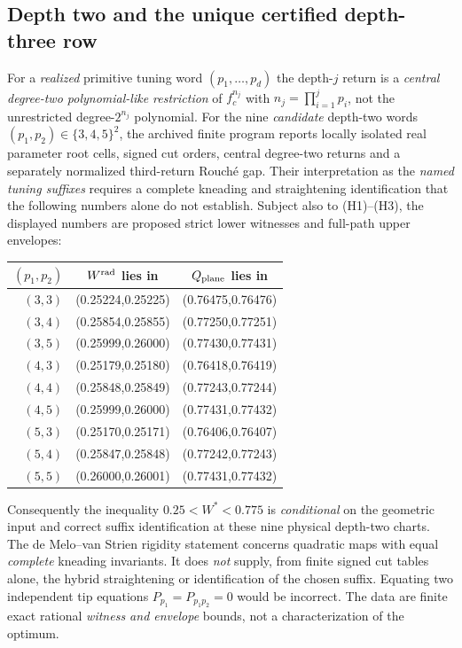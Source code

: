 \subsection{Depth two and the unique certified depth-three row}
For a \emph{realized} primitive
tuning word
$(p_1,\ldots,p_d)$
the depth-$j$ return is a
\emph{central degree-two
polynomial-like restriction}
of $f_c^{n_j}$ with
$n_j=\prod_{i=1}^j p_i$,
not the unrestricted
degree-$2^{n_j}$ polynomial.
For the nine \emph{candidate} depth-two
words $(p_1,p_2)\in\{3,4,5\}^2$,
the archived finite program reports
locally isolated real parameter
root cells, signed cut orders,
central degree-two returns and
a separately normalized third-return
Rouch\'e gap.  Their interpretation
as the \emph{named tuning suffixes}
requires a complete kneading and
straightening identification that
the following numbers alone do not
establish.  Subject also to (H1)--(H3),
the displayed numbers are proposed
strict lower witnesses and full-path
upper envelopes:
\begin{center}
\begin{tabular}{rcc}
\toprule
$(p_1,p_2)$ & $W^{\rm rad}$ lies in&
$Q_{\rm plane}$ lies in\\\midrule
$(3,3)$&(0.25224,0.25225)&(0.76475,0.76476)\\
$(3,4)$&(0.25854,0.25855)&(0.77250,0.77251)\\
$(3,5)$&(0.25999,0.26000)&(0.77430,0.77431)\\
$(4,3)$&(0.25179,0.25180)&(0.76418,0.76419)\\
$(4,4)$&(0.25848,0.25849)&(0.77243,0.77244)\\
$(4,5)$&(0.25999,0.26000)&(0.77431,0.77432)\\
$(5,3)$&(0.25170,0.25171)&(0.76406,0.76407)\\
$(5,4)$&(0.25847,0.25848)&(0.77242,0.77243)\\
$(5,5)$&(0.26000,0.26001)&(0.77431,0.77432)\\
\bottomrule
\end{tabular}
\end{center}
Consequently the inequality
$0.25<W^*<0.775$ is \emph{conditional}
on the geometric input and correct
suffix identification at these
nine physical depth-two charts.
The de Melo--van Strien rigidity
statement \cite[Theorem II.10.1]{deMeloVanStrien1993}
concerns quadratic maps with
equal \emph{complete} kneading
invariants.  It does \emph{not}
supply, from finite signed cut
tables alone, the hybrid
straightening or identification
of the chosen suffix.
Equating two independent
tip equations
$P_{p_1}=P_{p_1p_2}=0$
would be incorrect.
The data are finite exact
rational \emph{witness and
envelope} bounds, not
a characterization of
the optimum.

